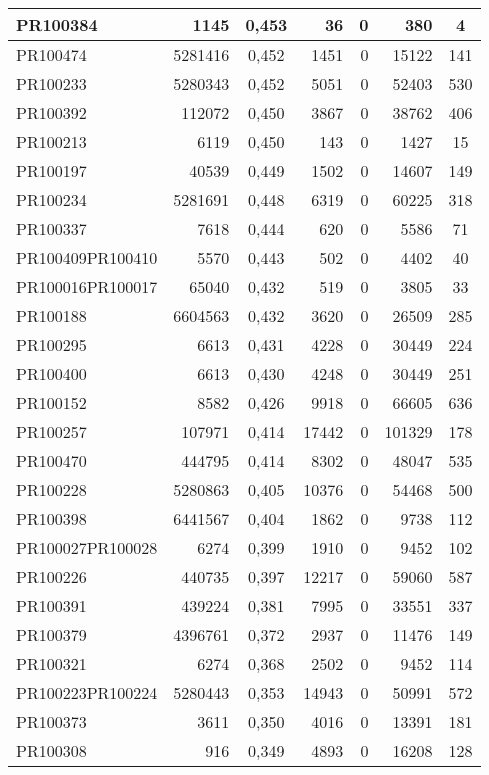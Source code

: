 \begin{center}
\begin{longtable}{lr|c|rrr|c}
	PR100384 & 1145 & 0,453 & 36 & 0 & 380 & 4 \\ \hline
	PR100474 & 5281416 & 0,452 & 1451 & 0 & 15122 & 141 \\ \hline
	PR100233 & 5280343 & 0,452 & 5051 & 0 & 52403 & 530 \\ \hline
	PR100392 & 112072 & 0,450 & 3867 & 0 & 38762 & 406 \\ \hline
	PR100213 & 6119 & 0,450 & 143 & 0 & 1427 & 15 \\ \hline
	PR100197 & 40539 & 0,449 & 1502 & 0 & 14607 & 149 \\ \hline
	PR100234 & 5281691 & 0,448 & 6319 & 0 & 60225 & 318 \\ \hline
	PR100337 & 7618 & 0,444 & 620 & 0 & 5586 & 71 \\ \hline
	PR100409PR100410 & 5570 & 0,443 & 502 & 0 & 4402 & 40 \\ \hline
	PR100016PR100017 & 65040 & 0,432 & 519 & 0 & 3805 & 33 \\ \hline
	PR100188 & 6604563 & 0,432 & 3620 & 0 & 26509 & 285 \\ \hline
	PR100295 & 6613 & 0,431 & 4228 & 0 & 30449 & 224 \\ \hline
	PR100400 & 6613 & 0,430 & 4248 & 0 & 30449 & 251 \\ \hline
	PR100152 & 8582 & 0,426 & 9918 & 0 & 66605 & 636 \\ \hline
	PR100257 & 107971 & 0,414 & 17442 & 0 & 101329 & 178 \\ \hline
	PR100470 & 444795 & 0,414 & 8302 & 0 & 48047 & 535 \\ \hline
	PR100228 & 5280863 & 0,405 & 10376 & 0 & 54468 & 500 \\ \hline
	PR100398 & 6441567 & 0,404 & 1862 & 0 & 9738 & 112 \\ \hline
	PR100027PR100028 & 6274 & 0,399 & 1910 & 0 & 9452 & 102 \\ \hline
	PR100226 & 440735 & 0,397 & 12217 & 0 & 59060 & 587 \\ \hline
	PR100391 & 439224 & 0,381 & 7995 & 0 & 33551 & 337 \\ \hline
	PR100379 & 4396761 & 0,372 & 2937 & 0 & 11476 & 149 \\ \hline
	PR100321 & 6274 & 0,368 & 2502 & 0 & 9452 & 114 \\ \hline
	PR100223PR100224 & 5280443 & 0,353 & 14943 & 0 & 50991 & 572 \\ \hline
	PR100373 & 3611 & 0,350 & 4016 & 0 & 13391 & 181 \\ \hline
	PR100308 & 916 & 0,349 & 4893 & 0 & 16208 & 128 \\ \hline

\end{longtable}
\end{center}
